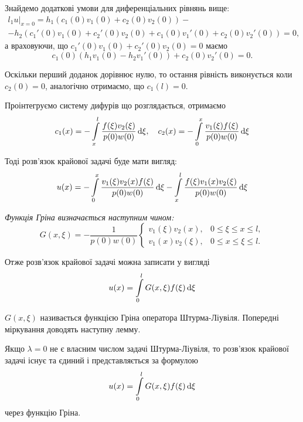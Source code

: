 Знайдемо додаткові умови для диференціальних рівнянь вище: 
\begin{multline} 
l_1u|_{x=0} = h_1(c_1(0)v_1(0) + c_2(0)v_2(0)) - \\
- h_2(c_1'(0)v_1(0) + c_2'(0)v_2(0) + c_1(0)v_1'(0) + c_2(0)v_2'(0)) = 0,
\end{multline}
а враховуючи, що $c_1'(0)v_1(0)+c_2'(0)v_2(0) = 0$ маємо
\begin{equation}
    c_1(0) (h_1v_1(0) - h_2v_1'(0)) + c_2(0)v_2'(0) = 0.
\end{equation}

Оскільки перший доданок дорівнює нулю, то остання рівність виконується коли $c_2(0) = 0$, аналогічно отримаємо, що $c_1(l) = 0$. \medskip

Проінтегруємо систему дифурів що розглядається, отримаємо
\begin{equation}
    c_1(x)=-\displaystyle\int\limits_x^l\dfrac{f(\xi)v_2(\xi)}{p(0)w(0)}\mathop{}\!\mathrm{d}\xi, \quad c_2(x)=-\displaystyle\int\limits_0^x\dfrac{v_1(\xi)f(\xi)}{p(0)w(0)}\mathop{}\!\mathrm{d}\xi
\end{equation}

Тоді розв'язок крайової задачі буде мати вигляд:
\begin{equation}
    u(x)=-\displaystyle\int\limits_0^x\dfrac{v_1(\xi)v_2(x)f(\xi)}{p(0)w(0)}\mathop{}\!\mathrm{d}\xi-\displaystyle\int\limits_x^l\dfrac{f(\xi)v_1(x)v_2(\xi)}{p(0)w(0)}\mathop{}\!\mathrm{d}\xi
\end{equation}

\begin{definition}
    \it{Функція Гріна} визначається наступним чином:
    \begin{equation}
        G(x, \xi) = - \dfrac{1}{p(0)w(0)} \begin{cases}
            v_1(\xi) v_2(x), & 0 \le \xi \le x \le l, \\
            v_1(x) v_2(\xi), & 0 \le x \le \xi \le l.
        \end{cases}
    \end{equation}
\end{definition}

Отже розв'язок крайової задачі можна записати у вигляді
\begin{equation}
    u(x) = \displaystyle\int\limits_0^l G(x, \xi) f(\xi) \mathop{}\!\mathrm{d} \xi
\end{equation}

$G(x, \xi)$ називається функцією Гріна оператора Штурма-Ліувіля. Попередні міркування доводять наступну лемму.
\begin{lemma}
    \label{lemma:2.5.5}
    Якщо $\lambda = 0$ не є власним числом задачі Штурма-Ліувіля, то роз\-в'яз\-ок крайової задачі існує та єдиний і представляється за формулою
    \begin{equation}
        u(x) = \displaystyle\int\limits_0^l G(x, \xi) f(\xi) \mathop{}\!\mathrm{d} \xi
    \end{equation}
    через функцію Гріна.
\end{lemma}

